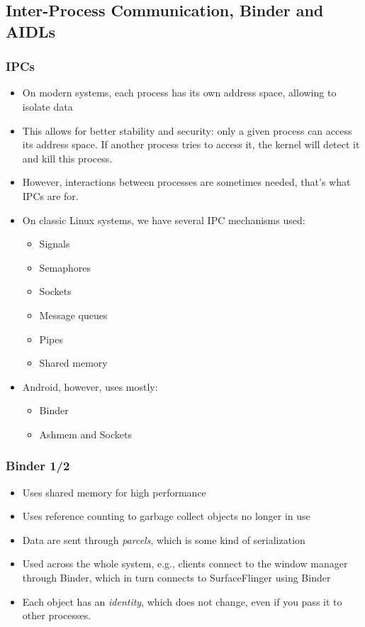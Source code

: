 \subsection[IPCs, Binder and AIDLs]{Inter-Process Communication, Binder and AIDLs}
\begin{frame}
  \frametitle{IPCs}
  \begin{itemize}
  \item On modern systems, each process has its own address space,
    allowing to isolate data
  \item This allows for better stability and security: only a given
    process can access its address space. If another process tries to
    access it, the kernel will detect it and kill this process.
  \item However, interactions between processes are sometimes needed,
    that's what IPCs are for.
  \item On classic Linux systems, we have several IPC mechanisms used:
    \begin{itemize}
    \item Signals
    \item Semaphores
    \item Sockets
    \item Message queues
    \item Pipes
    \item Shared memory
    \end{itemize}
  \item Android, however, uses mostly:
    \begin{itemize}
    \item Binder
    \item Ashmem and Sockets
    \end{itemize}
  \end{itemize}
\end{frame}

\begin{frame}
  \frametitle{Binder 1/2}
  \begin{itemize}
  \item Uses shared memory for high performance
  \item Uses reference counting to garbage collect objects no longer
    in use
  \item Data are sent through \emph{parcels}, which is some kind of
    serialization
  \item Used across the whole system, e.g., clients connect to the
    window manager through Binder, which in turn connects to
    SurfaceFlinger using Binder
  \item Each object has an \emph{identity}, which does not change,
    even if you pass it to other processes.
  \end{itemize}
\end{frame}

